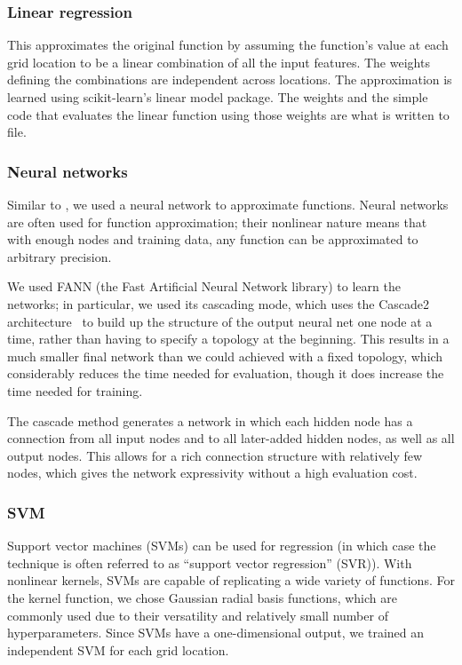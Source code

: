\documentclass{article}
\begin{document}
\subsubsection{Linear regression}
This approximates the original function by assuming the function's value at each grid location to be a linear combination of all the input features. The weights defining the combinations are independent across locations. The approximation is learned using scikit-learn's linear model package. The weights and the simple code that evaluates the linear function using those weights are what is written to file.

\subsubsection{Neural networks}

Similar to \cite{Esmaeilzadeh12}, we used a neural network to approximate functions. Neural networks are often used for function approximation; their nonlinear nature means that with enough nodes and training data, any function can be approximated to arbitrary precision.

We used FANN (the Fast Artificial Neural Network library) to learn the networks; in particular, we used its cascading mode, which uses the Cascade2 architecture~\cite{fahlman} to build up the structure of the output neural net one node at a time, rather than having to specify a topology at the beginning. This results in a much smaller final network than we could achieved with a fixed topology, which considerably reduces the time needed for evaluation, though it does increase the time needed for training.

The cascade method generates a network in which each hidden node has a connection from all input nodes and to all later-added hidden nodes, as well as all output nodes. This allows for a rich connection structure with relatively few nodes, which gives the network expressivity without a high evaluation cost.

\subsubsection{SVM}

Support vector machines (SVMs) can be used for regression (in which case the technique is often referred to as ``support vector regression'' (SVR)). With nonlinear kernels, SVMs are capable of replicating a wide variety of functions. For the kernel function, we chose Gaussian radial basis functions, which are commonly used due to their versatility and relatively small number of hyperparameters. Since SVMs have a one-dimensional output, we trained an independent SVM for each grid location.
\end{document}
